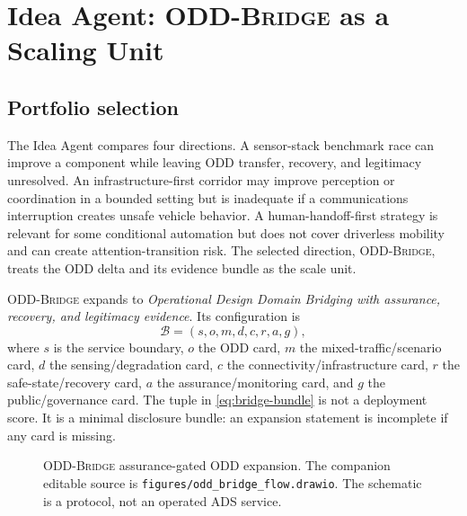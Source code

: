 \documentclass[conference]{../../../../Conference-LaTeX-template_10-17-19/IEEEtran}
\newcommand{\oddbridge}{\textsc{ODD-Bridge}}
\begin{document}
\section{Idea Agent: \oddbridge{} as a Scaling Unit}
\subsection{Portfolio selection}
The Idea Agent compares four directions. A sensor-stack benchmark race can improve a component while leaving ODD transfer, recovery, and legitimacy unresolved. An infrastructure-first corridor may improve perception or coordination in a bounded setting but is inadequate if a communications interruption creates unsafe vehicle behavior. A human-handoff-first strategy is relevant for some conditional automation but does not cover driverless mobility and can create attention-transition risk. The selected direction, \oddbridge{}, treats the ODD delta and its evidence bundle as the scale unit.

\oddbridge{} expands to \emph{Operational Design Domain Bridging with assurance, recovery, and legitimacy evidence}. Its configuration is
\begin{equation}
\mathcal{B}=\left(s,o,m,d,c,r,a,g\right),
\label{eq:bridge-bundle}
\end{equation}
where $s$ is the service boundary, $o$ the ODD card, $m$ the mixed-traffic/scenario card, $d$ the sensing/degradation card, $c$ the connectivity/infrastructure card, $r$ the safe-state/recovery card, $a$ the assurance/monitoring card, and $g$ the public/governance card. The tuple in \eqref{eq:bridge-bundle} is not a deployment score. It is a minimal disclosure bundle: an expansion statement is incomplete if any card is missing.

\begin{figure}[!t]
\centering
{}
\caption{\oddbridge{} assurance-gated ODD expansion. The companion editable source is \texttt{figures/odd\_bridge\_flow.drawio}. The schematic is a protocol, not an operated ADS service.}
\label{fig:bridge}
\end{figure}
\end{document}
